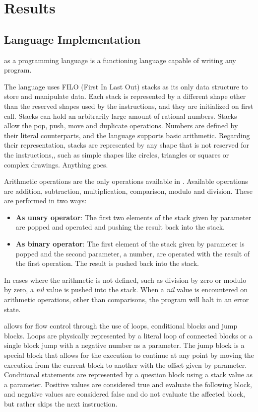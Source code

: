 
\section{Results}
\label{sec:results}

\subsection{Language Implementation}
\label{sec:results:language}

\sculpt as a programming language is a functioning language capable of writing any program.

The language uses FILO (First In Last Out) stacks as its only data structure to store and manipulate data. Each stack is represented by a different shape other than the reserved shapes used by the instructions, and they are initialized on first call.
Stacks can hold an arbitrarily large amount of rational numbers.
Stacks allow the pop, push, move and duplicate operations.
Numbers are defined by their literal counterparts, and the language supports basic arithmetic.
Regarding their representation, stacks are represented by any shape that is not reserved for the instructions,, such as simple shapes like circles, triangles or squares or complex drawings. Anything goes.

Arithmetic operations are the only operations available in \sculpt.
Available operations are addition, subtraction, multiplication, comparison, modulo and division.
These are performed in two ways:

\begin{itemize}
    \item \textbf{As unary operator}: The first two elements of the stack given by parameter are popped and operated and pushing the result back into the stack.
    \item \textbf{As binary operator}: The first element of the stack given by parameter is popped and the second parameter, a number, are operated with the result of the first operation. The result is pushed back into the stack.
\end{itemize}

In cases where the arithmetic is not defined, such as division by zero or modulo by zero, a \textit{nil} value is pushed into the stack.
When a \textit{nil} value is encountered on arithmetic operations, other than comparisons, the program will halt in an error state.

\sculpt allows for flow control through the use of loops, conditional blocks and jump blocks.
Loops are physically represented by a literal loop of connected blocks or a single block jump with a negative number as a parameter.
The jump block is a special block that allows for the execution to continue at any point by moving the execution from the current block to another with the offset given by parameter.
Conditional statements are represented by a question block using a stack value as a parameter. Positive values are considered true and evaluate the following block, and negative values are considered false and do not evaluate the affected block, but rather skips the next instruction.



